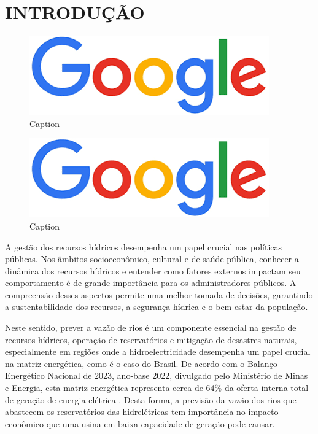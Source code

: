 \chapter{INTRODU\c{C}\~AO}  %



\begin{figure}[htb!]
    \centering
    \includegraphics[width=0.5\linewidth]{Figuras/google.png}
    \caption{Caption}
    \label{fig:enter-label}
\end{figure}

\begin{figure}[htb!]
    \centering
    \includegraphics[scale=0.3]{Figuras/google.png}
    \caption{Caption}
    \label{fig:enter-label}
\end{figure}


A gestão dos recursos hídricos desempenha um papel crucial nas políticas públicas. Nos âmbitos socioeconômico, cultural e de saúde pública, conhecer a dinâmica dos recursos hídricos e entender como fatores externos impactam seu comportamento é de grande importância para os administradores públicos. A compreensão desses aspectos permite uma melhor tomada de decisões, garantindo a sustentabilidade dos recursos, a segurança hídrica e o bem-estar da população.

Neste sentido, prever a vazão de rios é um componente essencial na gestão de recursos hídricos, operação de reservatórios e mitigação de desastres naturais, especialmente em regiões onde a hidroelectricidade desempenha um papel crucial na matriz energética, como é o caso do Brasil. De acordo com o Balanço Energético Nacional de 2023, ano-base 2022, divulgado pelo Ministério de Minas e Energia, esta matriz energética representa cerca de 64\% da oferta interna total de geração de energia elétrica \cite{epe2023ben}. Desta forma, a previsão da vazão dos rios que abastecem os reservatórios das hidrelétricas tem importância no impacto econômico que uma usina em baixa capacidade de geração pode causar.

